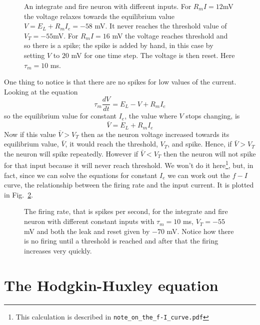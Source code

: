 \documentclass[11pt,a4paper]{scrartcl}
\begin{document}
\begin{figure}
\begin{center}

\end{center}
\caption{An integrate and fire neuron with different inputs. For
  $R_mI=12 $mV the voltage relaxes towards the equilibrium value
  $V=E_L+R_mI_e=-58$ mV. It never reaches the threshold value of
  $V_T=-55 $mV. For $R_mI=16$ mV the voltage reaches threshold and so
  there is a spike; the spike is added by hand, in this case by
  setting $V$ to $20$ mV for one time step. The voltage is then
  reset. Here $\tau_m=10$ ms.\label{v_i_f}}
\end{figure}

One thing to notice is that there are no spikes for low values of the current. Looking at the equation 
\begin{equation}
\tau_m\frac{dV}{dt}=E_L-V+R_mI_e
\end{equation}
so the equilibrium value for constant $I_e$, the value where $V$ stops changing, is
\begin{equation}
\bar{V}=E_L+R_mI_e
\end{equation}
Now if this value $\bar{V}>V_T$ then as the neuron voltage increased
towards its equilibrium value, $\bar{V}$, it would reach the
threshold, $V_T$, and spike. Hence, if $\bar{V}>V_T$ the neuron will
spike repeatedly.  However if $\bar{V}<V_T$ then the neuron will not
spike for that input because it will never reach threshold. We won't do it here\footnote{This calculation is described in \texttt{note\_on\_the\_f-I\_curve.pdf}}, but, in fact, since we can
solve the equations for constant $I_e$ we can work out the $f-I$
curve, the relationship between the firing rate and the input
current. It is plotted in Fig.~\ref{f_i_curve}.


\begin{figure}
\begin{center}

\end{center}
\caption{The firing rate, that is spikes per second, for the integrate
  and fire neuron with different constant inputs with $\tau_m=10$ ms,
  $V_T=-55$ mV and both the leak and reset given by $-70$ mV. Notice
  how there is no firing until a threshold is reached and after that
  the firing increases very quickly. \label{f_i_curve}}
\end{figure}

\section*{The Hodgkin-Huxley equation}
\end{document}
